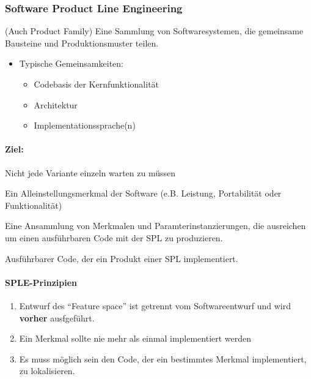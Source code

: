 \documentclass[
    ngerman,
    color=3b,
    summary,
    boxarc,
    main,
]{rubos-tuda-template}
\begin{document}
\subsubsection{Software Product Line Engineering}
\begin{definition} (Auch Product Family)
    Eine Sammlung von Softwaresystemen, die gemeinsame Bausteine und Produktionsmuster teilen.
\end{definition}
\begin{itemize}
    \item Typische Gemeinsamkeiten:\begin{itemize}
              \item Codebasis der Kernfunktionalität
              \item Architektur
              \item Implementationssprache(n)
          \end{itemize}
\end{itemize}
\paragraph{Ziel:} Nicht jede Variante einzeln warten zu müssen
\clearpage
\begin{definition}
    Ein Alleinstellungsmerkmal der Software (e.B. Leistung, Portabilität oder Funktionalität)
\end{definition}
\begin{definition}[Produkt]
    Eine Ansammlung von Merkmalen und Paramterinstanzierungen, die ausreichen um einen ausführbaren Code mit der SPL zu produzieren.
\end{definition}
\begin{definition}
    Ausführbarer Code, der ein Produkt einer SPL implementiert.
\end{definition}

\paragraph{SPLE-Prinzipien}
\begin{enumerate}
    \item Entwurf des \enquote{Feature space} ist getrennt vom Softwareentwurf und wird \textbf{vorher} ausfgeführt.
    \item Ein Merkmal sollte nie mehr als einmal implementiert werden
    \item Es muss möglich sein den Code, der ein bestimmtes Merkmal implementiert, zu lokalisieren.
\end{enumerate}
\end{document}
